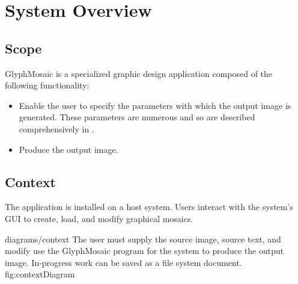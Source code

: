 \section{System Overview}
\subsection{Scope}
GlyphMosaic is a specialized graphic design application composed of the following functionality:
\begin{itemize}
  \item Enable the user to specify the parameters with which the output image is generated.  These parameters are numerous and so are described comprehensively in .
  \item Produce the output image.
\end{itemize}


\subsection{Context}
The application is installed on a host system.
Users interact with the system's GUI to create, load, and modify graphical mosaics.

\sidiagram
{diagrams/context}
{The user must supply the source image, source text, and modify use the GlyphMosaic program for the system to produce the output image.  In-progress work can be saved as a file system document.}
{fig:contextDiagram}
{\diagsize}